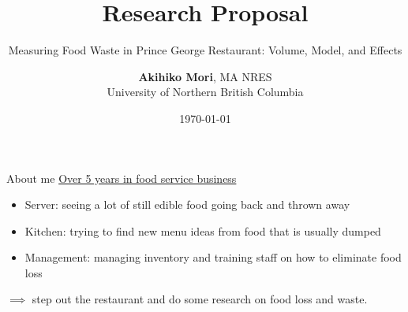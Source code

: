 \documentclass{beamer}
\title{Research Proposal}
\subtitle{Measuring Food Waste in Prince George Restaurant: Volume, Model, and Effects}
\author{\textbf{Akihiko Mori}, MA NRES \texorpdfstring{\\University of Northern British Columbia}
\texorpdfstring{\\Supervisor: Dr. Deo Balbinder}{}}
\date{\today}
\begin{document}
\begin{frame}
    \maketitle
\end{frame}

\begin{frame}{About me}
  \underline{Over 5 years in food service business}
  \begin{itemize}
    \item Server: seeing a lot of still edible food going back and thrown away\\
    \item Kitchen: trying to find new menu ideas from food that is usually dumped\\
    \item Management: managing inventory and training staff on how to eliminate food loss\\
  \end{itemize}
  $\implies$ step out the restaurant and do some research on food loss and waste.
\end{frame}
\end{document}
